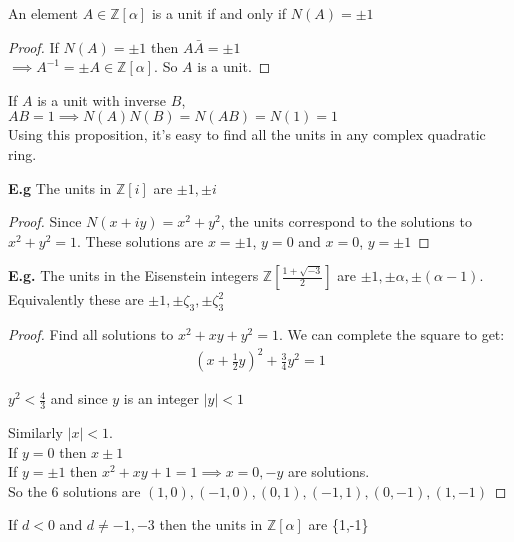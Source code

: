 \documentclass[11pt]{article}
\begin{document}
\begin{corollary}
	An element $A \in \mathbb{Z}[\alpha] $ is a unit if and only if $N(A) = \pm 1$
\end{corollary}

\begin{proof}
	If $N(A) = \pm 1$ then $A \bar A = \pm 1$\\
	\hspace{105pt} $\implies A^{-1} = \pm A \in \mathbb{Z}[\alpha]$. So $A $ is a unit.
\end{proof}

If $A$ is a unit with inverse $B$, $AB = 1 \implies N(A)N(B) = N(AB) = N(1) = 1 $\\

Using this proposition, it's easy to find all the units in any complex quadratic ring.


\textbf{E.g} The units in $\mathbb{Z}[i] $ are $\pm 1, \pm i$


\begin{proof}
	Since $N(x+iy) = x^2 + y^2 $, the units correspond to the solutions to $x^2 + y^2 = 1$. These solutions are $x = \pm 1$, $y = 0$ and $x =0 $, $y = \pm 1$
\end{proof}


\newpage

\textbf{E.g.} The units in the Eisenstein integers $\mathbb{Z}[\frac{1+\sqrt{-3}}{2}]$ are  $\pm 1, \pm \alpha, \pm (\alpha -1)$. Equivalently these are $\pm 1, \pm \zeta_3, \pm \zeta^2_3$


\begin{proof}
Find all solutions to $x^2 + xy +y^2 = 1$. We can complete the square to get:
	\begin{align*}
		(x+\frac{1}{2}y)^2 + \frac{3}{4}y^2 = 1
	\end{align*}

	$y^2 < \frac{4}{3}$ and since $y$ is an integer $|y|< 1$

	Similarly $|x| <1 $.\\[1em]

	If $y=0 $ then $x \pm 1$\\
	If $y=\pm 1 $ then $x^2 + xy+ 1 = 1 \implies x=0,-y $ are solutions.\\[1em]

	So the 6 solutions are $(1,0), (-1,0), (0,1), (-1,1), (0,-1), (1,-1)$

\end{proof}


\begin{corollary}
	If $d<0$ and $d\neq -1,-3$ then the units in $\mathbb{Z}[\alpha]$ are \{1,-1\}
\end{corollary}
\end{document}
